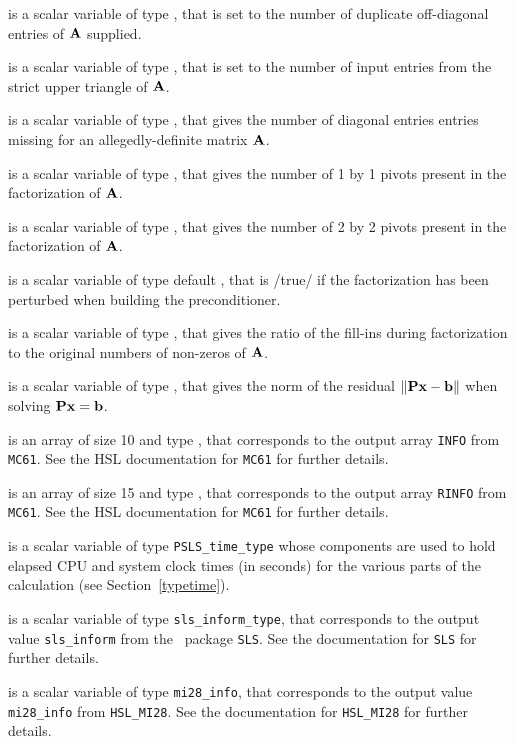 \documentclass{galahad}
\newcommand{\packagename}{PSLS}
\begin{document}
\begin{description}
 is a scalar variable of type \integer,
that is set to the number of duplicate off-diagonal entries of ${\mathbf{A}}$ supplied.

 is a scalar variable of type \integer,
that is set to the number of input entries from the strict upper triangle
of ${\mathbf{A}}$.

 is a scalar variable of type \integer,
that gives the number of diagonal entries entries missing for an
allegedly-definite matrix ${\mathbf{A}}$.

 is a scalar variable of type \integer,
that gives the number of 1 by 1 pivots present in the factorization
of ${\mathbf{A}}$.

 is a scalar variable of type \integer,
that gives the number of 2 by 2 pivots present in the factorization
of ${\mathbf{A}}$.

 is a scalar variable of type default \logical,
that is /true/ if the factorization has been perturbed when building the
preconditioner.

 is a scalar variable of type \realdp,
that gives the ratio of the fill-ins during factorization to the
original numbers of non-zeros of ${\mathbf{A}}$.

 is a scalar variable of type \realdp,
that gives the norm of the residual $\|{\mathbf{P}} {\mathbf{x}} - {\mathbf{b}}\|$
when solving ${\mathbf{P}} {\mathbf{x}} = {\mathbf{b}}$.

 is an array of size 10 and type \integer,
that corresponds to the output array {\tt INFO}
from {\tt MC61}. See the HSL documentation for {\tt MC61} for further
details.

 is an array of size 15 and type \realdp,
that corresponds to the output array {\tt RINFO}
from {\tt MC61}. See the HSL documentation for {\tt MC61} for further
details.

 is a scalar variable of type {\tt \packagename\_time\_type}
whose components are used to hold elapsed CPU and system clock times
(in seconds) for the various parts of the calculation
(see Section~\ref{typetime}).

 is a scalar variable of type {\tt sls\_inform\_type},
that corresponds to the output value {\tt sls\_inform} from the \libraryname\ 
package {\tt SLS}. See the documentation for {\tt SLS} for further details.

 is a scalar variable of type {\tt mi28\_info},
that corresponds to the output value {\tt mi28\_info}
from {\tt HSL\_MI28}. See the documentation for {\tt HSL\_MI28} for further
details.

\end{description}
\end{document}
